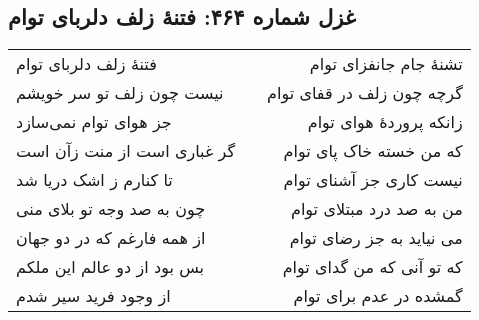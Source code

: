 \begin{center}
\section*{غزل شماره ۴۶۴: فتنهٔ زلف دلربای توام}
\label{sec:464}
\begin{longtable}{l p{0.5cm} r}
فتنهٔ زلف دلربای توام
&&
تشنهٔ جام جانفزای توام
\\
نیست چون زلف تو سر خویشم
&&
گرچه چون زلف در قفای توام
\\
جز هوای توام نمی‌سازد
&&
زانکه پروردهٔ هوای توام
\\
گر غباری است از منت زآن است
&&
که من خسته خاک پای توام
\\
تا کنارم ز اشک دریا شد
&&
نیست کاری جز آشنای توام
\\
چون به صد وجه تو بلای منی
&&
من به صد درد مبتلای توام
\\
از همه فارغم که در دو جهان
&&
می نیاید به جز رضای توام
\\
بس بود از دو عالم این ملکم
&&
که تو آنی که من گدای توام
\\
از وجود فرید سیر شدم
&&
گمشده در عدم برای توام
\\
\end{longtable}
\end{center}
